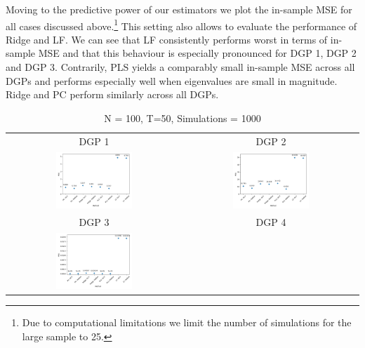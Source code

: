 


Moving to the predictive power of our estimators we plot the in-sample MSE for all cases discussed above.\footnote{Due to computational limitations we limit the number of simulations for the large sample to 25.} This setting also allows to evaluate the performance of Ridge and LF. We can see that LF consistently performs worst in terms of in-sample MSE and that this behaviour is especially pronounced for DGP 1, DGP 2 and DGP 3. Contrarily, PLS yields a comparably small in-sample MSE across all DGPs and performs especially well when eigenvalues are small in magnitude. Ridge and PC perform similarly across all DGPs. 

\begin{table}[h! ]
     \centering
     \caption*{N = 100, T=50, Simulations = 1000}
     \begin{tabular}{c c}
     DGP 1 & DGP 2 \\
         \includegraphics[width=0.45\textwidth]{figures/N100_T50_DGP1_Sims1000.png} & \includegraphics[width=0.45\textwidth]{figures/N100_T50_DGP2_Sims1000.png} \\
                 DGP 3 & DGP 4 \\
         \includegraphics[width=0.45\textwidth]{figures/N100_T50_DGP3_Sims1000} &

\end{tabular}
\end{table}
